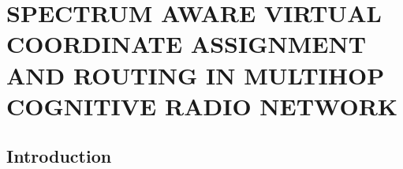 \chapter{SPECTRUM AWARE VIRTUAL COORDINATE ASSIGNMENT AND ROUTING IN MULTIHOP COGNITIVE RADIO NETWORK}
%
%



\section{Introduction}
\label{introduction}

